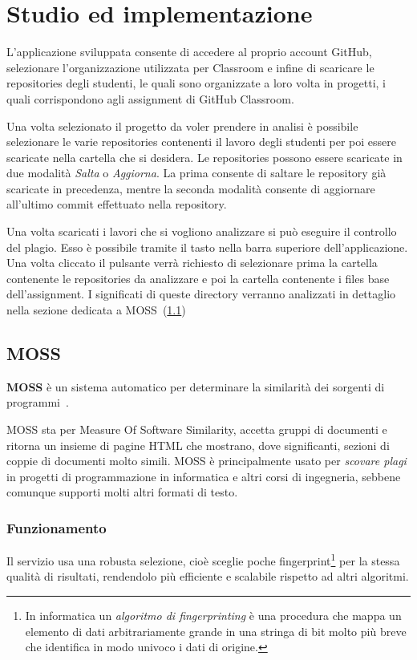 \chapter{Studio ed implementazione}
	L'applicazione sviluppata consente di accedere al proprio account GitHub, selezionare l'organizzazione utilizzata per Classroom e infine di scaricare le repositories degli studenti, le quali sono organizzate a loro volta in progetti, i quali corrispondono agli assignment di GitHub Classroom.
	
	Una volta selezionato il progetto da voler prendere in analisi è possibile selezionare le varie repositories contenenti il lavoro degli studenti per poi essere scaricate nella cartella che si desidera.
	Le repositories possono essere scaricate in due modalità \textit{Salta} o \textit{Aggiorna}. La prima consente di saltare le repository già scaricate in precedenza, mentre la seconda modalità consente di aggiornare all'ultimo commit effettuato nella repository.
	
	Una volta scaricati i lavori che si vogliono analizzare si può eseguire il controllo del plagio. Esso è possibile tramite il tasto nella barra superiore dell'applicazione. Una volta cliccato il pulsante verrà richiesto di selezionare prima la cartella contenente le repositories da analizzare e poi la cartella contenente i files base dell'assignment.
	I significati di queste directory verranno analizzati in dettaglio nella sezione dedicata a MOSS~(\ref{def:MOSS})
	
	
	\section{MOSS}\label{def:MOSS}	
		\textbf{MOSS} è un sistema automatico per determinare la similarità dei sorgenti di programmi~\citep{AikenMOSS}. 
		
		MOSS sta per Measure Of Software Similarity, accetta gruppi di documenti e ritorna un insieme di pagine HTML che mostrano, dove significanti, sezioni di coppie di documenti molto simili. MOSS è principalmente usato per \textit{scovare plagi} in progetti di programmazione in informatica e altri corsi di ingegneria, sebbene comunque supporti molti altri formati di testo. 
		
		\subsection*{Funzionamento~\citep{Clough2000}}
			Il servizio usa una robusta selezione, cioè sceglie poche fingerprint\footnote{In informatica un \textit{algoritmo di fingerprinting} è una procedura che mappa un elemento di dati arbitrariamente grande in una stringa di bit molto più breve che identifica in modo univoco i dati di origine.} per la stessa qualità di risultati, rendendolo più efficiente e scalabile rispetto ad altri algoritmi.
			
